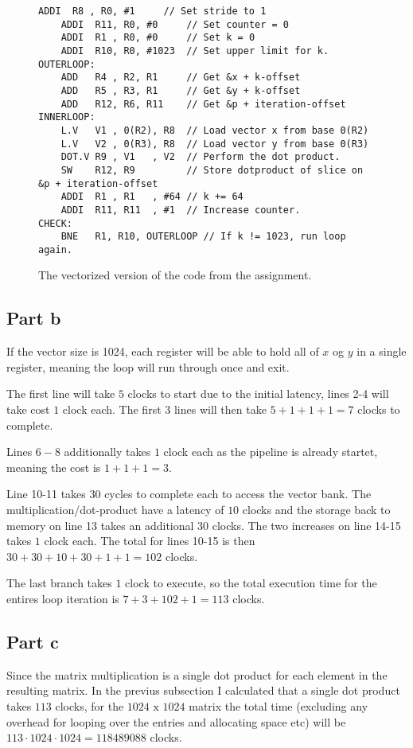 \begin{figure}
    \begin{lstlisting}[language={[x86masm]Assembler}]
    ADDI  R8 , R0, #1     // Set stride to 1
    ADDI  R11, R0, #0     // Set counter = 0
    ADDI  R1 , R0, #0     // Set k = 0
    ADDI  R10, R0, #1023  // Set upper limit for k.
OUTERLOOP:
    ADD   R4 , R2, R1     // Get &x + k-offset
    ADD   R5 , R3, R1     // Get &y + k-offset
    ADD   R12, R6, R11    // Get &p + iteration-offset
INNERLOOP:
    L.V   V1 , 0(R2), R8  // Load vector x from base 0(R2)
    L.V   V2 , 0(R3), R8  // Load vector y from base 0(R3)
    DOT.V R9 , V1   , V2  // Perform the dot product.
    SW    R12, R9         // Store dotproduct of slice on &p + iteration-offset
    ADDI  R1 , R1   , #64 // k += 64
    ADDI  R11, R11  , #1  // Increase counter.
CHECK:
    BNE   R1, R10, OUTERLOOP // If k != 1023, run loop again.
    \end{lstlisting}
    \caption{The vectorized version of the code from the assignment.}
    \label{fig:t22acode}
\end{figure}

\subsection{Part b}

If the vector size is 1024, each register will be able to hold all of $x$ og $y$
in a single register, meaning the loop will run through once and exit.

The first line will take $5$ clocks to start due to the initial latency, lines
2-4 will take cost $1$ clock each. The first 3 lines will then take
$5+1+1+1 = 7$ clocks to complete.

Lines $6-8$ additionally takes $1$ clock each as the pipeline is already
startet, meaning the cost is $1+1+1 = 3$.

Line 10-11 takes $30$ cycles to complete each to access the vector bank. The
multiplication/dot-product have a latency of $10$ clocks and the storage back
to memory on line 13 takes an additional $30$ clocks. The two increases on
line 14-15 takes $1$ clock each. The total for lines 10-15 is then
$30+30+10+30+1+1 = 102$ clocks.

The last branch takes $1$ clock to execute, so the total execution time for the
entires loop iteration is $7 + 3 + 102 + 1 = 113$ clocks.


\subsection{Part c}

Since the matrix multiplication is a single dot product for each element in the
resulting matrix. In the previus subsection I calculated that a single dot
product takes $113$ clocks, for the $1024 \text{ x } 1024$ matrix the total time
(excluding any overhead for looping over the entries and allocating space etc)
will be $113 \cdot 1024 \cdot 1024 = 118489088$ clocks.
